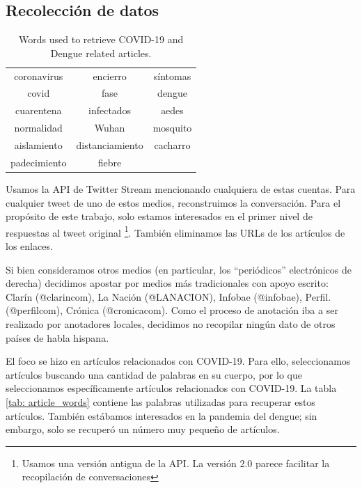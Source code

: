 \subsection{Recolección de datos}

\begin{table}[t]
    \centering
    \begin{tabular}{ c|c|c }
        coronavirus  &  encierro          & síntomas \\
        covid        &  fase              & dengue   \\
        cuarentena   &  infectados        & aedes    \\
        normalidad   &  Wuhan             & mosquito \\
        aislamiento  &  distanciamiento   & cacharro \\
        padecimiento &  fiebre            &          \\
    \end{tabular}
    \caption{Words used to retrieve COVID-19 and Dengue related articles.\label{tab:article_words}}
\end{table}






Usamos la API de Twitter Stream mencionando cualquiera de estas cuentas.  Para cualquier tweet de uno de estos medios, reconstruimos la conversación. Para el propósito de este trabajo, solo estamos interesados en el primer nivel de respuestas al tweet original \footnote{Usamos una versión antigua de la API. La versión 2.0 parece facilitar la recopilación de conversaciones}. También eliminamos las URLs de los artículos de los enlaces.


Si bien consideramos otros medios (en particular, los ``periódicos'' electrónicos de derecha) decidimos apostar por medios más tradicionales con apoyo escrito: Clarín (@clarincom), La Nación (@LANACION), Infobae (@infobae), Perfil. (@perfilcom), Crónica (@cronicacom). Como el proceso de anotación iba a ser realizado por anotadores locales, decidimos no recopilar ningún dato de otros países de habla hispana.


El foco se hizo en artículos relacionados con COVID-19. Para ello, seleccionamos artículos buscando una cantidad de palabras en su cuerpo, por lo que seleccionamos específicamente artículos relacionados con COVID-19. La tabla \ref{tab: article_words} contiene las palabras utilizadas para recuperar estos artículos. También estábamos interesados en la pandemia del dengue; sin embargo, solo se recuperó un número muy pequeño de artículos.

